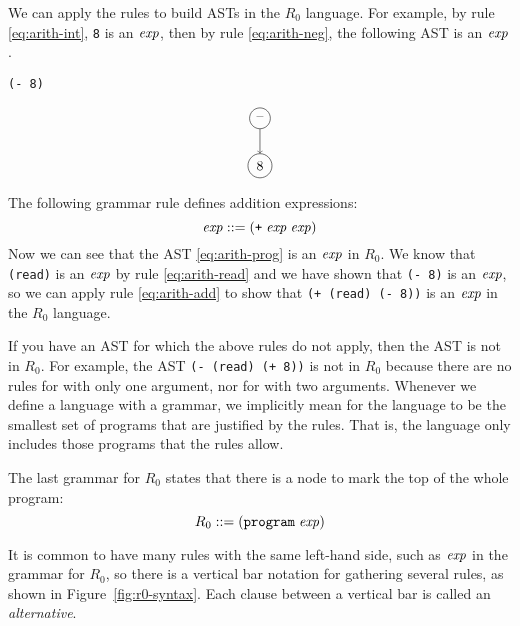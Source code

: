 \documentclass[11pt]{book}
\begin{document}
We can apply the rules to build ASTs in the $R_0$
language. For example, by rule \eqref{eq:arith-int}, \texttt{8} is an
$\mathit{exp}$, then by rule \eqref{eq:arith-neg}, the following AST is
an $\mathit{exp}$.
\begin{center}
\begin{minipage}{0.25\textwidth}
\begin{lstlisting}
(- 8)
\end{lstlisting}
\end{minipage}
\begin{minipage}{0.25\textwidth}
\begin{equation}
\begin{tikzpicture}
 \node[draw, circle] (minus) at (0, 0)  {$\text{--}$};
 \node[draw, circle] (8)     at (0, -1.2) {$8$};

 \draw[->] (minus) to (8);
\end{tikzpicture}
\label{eq:arith-neg8}
\end{equation}
\end{minipage}
\end{center}

The following grammar rule defines addition expressions:
\begin{equation}
  \mathit{exp} ::= (\texttt{+} \; \mathit{exp} \; \mathit{exp}) \label{eq:arith-add}
\end{equation}
Now we can see that the AST \eqref{eq:arith-prog} is an $\mathit{exp}$ in
$R_0$.  We know that \lstinline{(read)} is an $\mathit{exp}$ by rule
\eqref{eq:arith-read} and we have shown that \texttt{(- 8)} is an
$\mathit{exp}$, so we can apply rule \eqref{eq:arith-add} to show that
\texttt{(+ (read) (- 8))} is an $\mathit{exp}$ in the $R_0$ language.

If you have an AST for which the above rules do not apply, then the
AST is not in $R_0$. For example, the AST \texttt{(- (read) (+ 8))} is
not in $R_0$ because there are no rules for \key{+} with only one
argument, nor for \key{-} with two arguments.  Whenever we define a
language with a grammar, we implicitly mean for the language to be the
smallest set of programs that are justified by the rules. That is, the
language only includes those programs that the rules allow.

The last grammar for $R_0$ states that there is a  node
to mark the top of the whole program:
\[
  R_0 ::= (\texttt{program} \; \mathit{exp})
\]

It is common to have many rules with the same left-hand side, such as
$\mathit{exp}$ in the grammar for $R_0$, so there is a vertical bar notation
for gathering several rules, as shown in
Figure~\ref{fig:r0-syntax}. Each clause between a vertical bar is
called an {\em alternative}.
\end{document}
